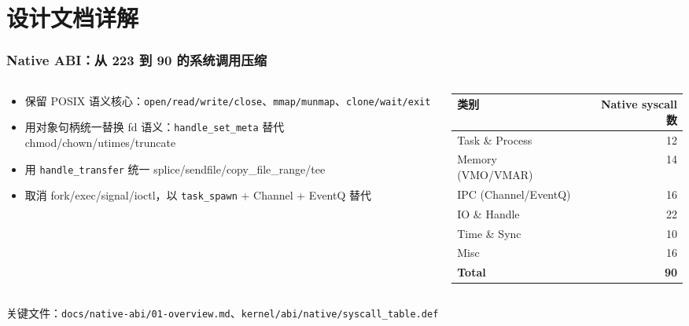 \documentclass[aspectratio=1610]{beamer}
\newcommand{\code}[1]{\texttt{\footnotesize #1}}
\begin{document}
\section{设计文档详解}

\begin{frame}
    \frametitle{Native ABI：从 223 到 90 的系统调用压缩}
    \begin{columns}
        \begin{column}{0.55\textwidth}
            \footnotesize
            \begin{itemize}
                \item 保留 POSIX 语义核心：\code{open/read/write/close}、\code{mmap/munmap}、\code{clone/wait/exit}
                \item 用对象句柄统一替换 fd 语义：\code{handle\_set\_meta} 替代 chmod/chown/utimes/truncate
                \item 用 \code{handle\_transfer} 统一 splice/sendfile/copy\_file\_range/tee
                \item 取消 fork/exec/signal/ioctl，以 \code{task\_spawn} + Channel + EventQ 替代
            \end{itemize}
        \end{column}
        \begin{column}{0.42\textwidth}
            \footnotesize
            \begin{table}
                \centering
                \renewcommand{\arraystretch}{1.1}
                \begin{tabular}{lr}
                    \toprule
                    \textbf{类别} & \textbf{Native syscall 数} \\
                    \midrule
                    Task \& Process & 12 \\
                    Memory (VMO/VMAR) & 14 \\
                    IPC (Channel/EventQ) & 16 \\
                    IO \& Handle & 22 \\
                    Time \& Sync & 10 \\
                    Misc & 16 \\
                    \midrule
                    \textbf{Total} & \textbf{90} \\
                    \bottomrule
                \end{tabular}
            \end{table}
        \end{column}
    \end{columns}
    \vspace{0.3em}
    \small 关键文件：\code{docs/native-abi/01-overview.md}、\code{kernel/abi/native/syscall\_table.def}
\end{frame}
\end{document}
